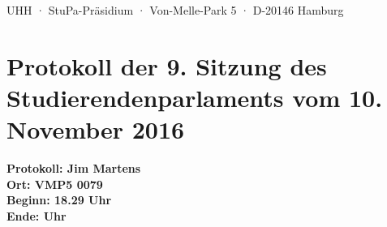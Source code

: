 \documentclass[ngerman,headheight=70pt]{scrartcl}
\begin{document}
    UHH · StuPa-Präsidium · Von-Melle-Park 5 · D-20146 Hamburg

    \section*{Protokoll der 9. Sitzung des Studierendenparlaments vom 10. November 2016}

    \textbf{Protokoll: Jim Martens}\\
    \textbf{Ort: VMP5 0079}\\
    \textbf{Beginn: 18.29 Uhr}\\
    \textbf{Ende: Uhr}

    \vspace{0.5cm}
\end{document}
